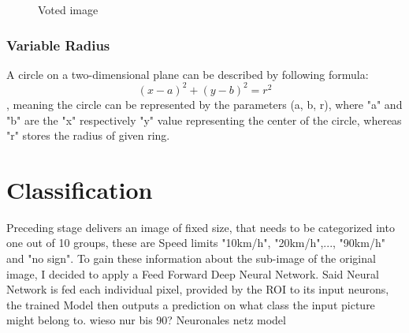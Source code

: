 \begin{figure}[H]
	\caption{Voted image }\label{fig:voted_image}
	\endminipage
\end{figure}

\subsubsection{Variable Radius}
A circle on a two-dimensional plane can be described by following formula: \[ (x - a)^2 + (y - b)^2 = r^2  \]
, meaning the circle can be represented by the parameters (a, b, r), where "a" and "b" are the "x" respectively "y" value representing the center of the circle, whereas "r" stores the radius of given ring. 

\section{Classification}
Preceding stage delivers an image of fixed size, that needs to be categorized into one out of 10 groups, these are Speed limits "10km/h", "20km/h",..., "90km/h" and "no sign". To gain these information about the sub-image of the original image, I decided to apply a Feed Forward Deep Neural Network. Said Neural Network is fed each individual pixel, provided by the ROI to its input neurons, the trained Model then outputs a prediction on what class the input picture might belong to. 
\newline
wieso nur bis 90? 
\newline
Neuronales netz model
